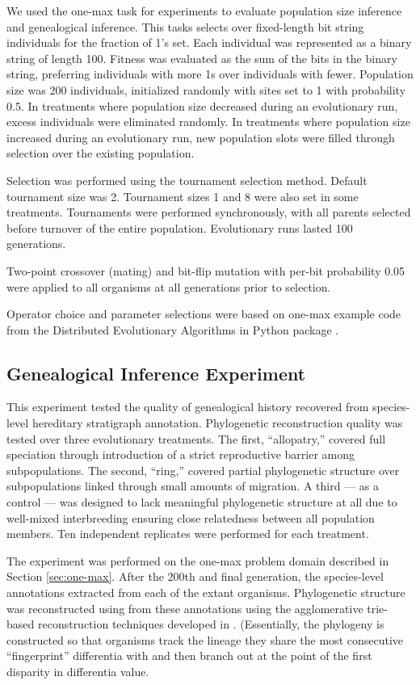 We used the one-max task for experiments to evaluate population size inference and genealogical inference.
This tasks selects over fixed-length bit string individuals for the fraction of 1's set.
Each individual was represented as a binary string of length 100.
Fitness was evaluated as the sum of the bits in the binary string, preferring individuals with more 1s over individuals with fewer.
Population size was 200 individuals, initialized randomly with sites set to 1 with probability 0.5.
In treatments where population size decreased during an evolutionary run, excess individuals were eliminated randomly.
In treatments where population size increased during an evolutionary run,
new population slots were filled through selection over the existing population.

Selection was performed using the tournament selection method.
Default tournament size was 2.
Tournament sizes 1 and 8 were also set in some treatments.
Tournaments were performed synchronously, with all parents selected before turnover of the entire population.
Evolutionary runs lasted 100 generations.

Two-point crossover (mating) and bit-flip mutation with per-bit probability 0.05 were applied to all organisms at all generations prior to selection.

Operator choice and parameter selections were based on one-max example code from the Distributed Evolutionary Algorithms in Python package \citep{fortin2012deap}.

\subsection{Genealogical Inference Experiment}
\label{sec:genealogical-inference}

This experiment tested the quality of genealogical history recovered from species-level hereditary stratigraph annotation.
Phylogenetic reconstruction quality was tested over three evolutionary treatments.
The first, ``allopatry,'' covered full speciation through introduction of a strict reproductive barrier among subpopulations.
The second, ``ring,'' covered partial phylogenetic structure over subpopulations linked through small amounts of migration.
A third --- as a control --- was designed to lack meaningful phylogenetic structure at all due to well-mixed interbreeding ensuring close relatedness between all population members.
Ten independent replicates were performed for each treatment.

The experiment was performed on the one-max problem domain described in Section \ref{sec:one-max}.
After the 200th and final generation, the species-level annotations extracted from each of the extant organisms.
Phylogenetic structure was reconstructed using from these annotations using the agglomerative trie-based reconstruction techniques developed in \citep{moreno2023toward}.
(Essentially, the phylogeny is constructed so that organisms track the lineage they share the most consecutive ``fingerprint'' differentia with and then branch out at the point of the first disparity in differentia value.

